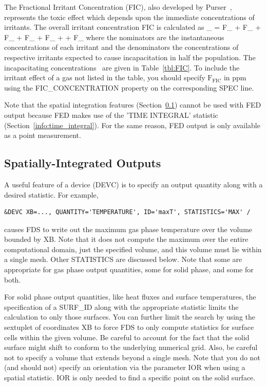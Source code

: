 \documentclass[11pt]{book}
\begin{document}
The Fractional Irritant Concentration (FIC), also developed by Purser~\cite{SFPE:Purser}, represents the toxic effect which
depends upon the immediate concentrations of irritants. The overall irritant concentration FIC is calculated as
\be
{}_ =
        {F_} +
        {F_} +
         {F_} +
       {F_} +
       {F_} +
     +
      {F_}
\ee
where the nominators are the instantaneous concentrations of each irritant and the denominators the concentrations of respective irritants
expected to cause incapacitation in half the population. The incapacitating concentrations~\cite{SFPE:Purser} are given in Table~\ref{tbl:FIC}.
To include the irritant effect of a gas not listed in the table, you should specify $\mathrm{F_{FIC}}$ in ppm using the {\ct FIC\_CONCENTRATION}
property on the corresponding {\ct SPEC} line.

Note that the spatial integration features (Section~\ref{info:statistics}) cannot be used with FED output because FED makes
use of the {\ct 'TIME INTEGRAL'} statistic (Section~\ref{info:time_integral}). For the same reason, FED output is only available as a point
measurement.

\subsection{Spatially-Integrated Outputs}
\label{info:statistics}

A useful feature of a device ({\ct DEVC}) is to specify an output quantity along with a desired statistic. For example,
\begin{lstlisting}
&DEVC XB=..., QUANTITY='TEMPERATURE', ID='maxT', STATISTICS='MAX' /
\end{lstlisting}
causes FDS to write out the maximum gas phase temperature over the volume bounded by {\ct XB}. Note that it
does not compute the maximum over the entire computational domain, just the specified volume, and this volume must lie within a single mesh.
Other {\ct STATISTICS} are discussed below.  Note that some are appropriate for gas phase output quantities, some for solid phase,
and some for both.

For solid phase output quantities, like heat fluxes and surface temperatures, the
specification of a {\ct SURF\_ID} along with the appropriate statistic limits the calculation to only those surfaces. You can further limit the search by using the
sextuplet of coordinates {\ct XB} to force FDS to only compute statistics for surface cells within the given volume. Be careful to
account for the fact that the solid surface might shift to conform to the underlying numerical grid. Also, be careful not to specify a
volume that extends beyond a single mesh. Note that you do not (and should not) specify an orientation via the parameter {\ct IOR} when using
a spatial statistic. {\ct IOR} is only needed to find a specific point on the solid surface.
\end{document}
